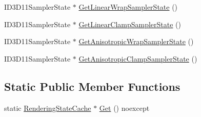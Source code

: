 \begin{DoxyCompactItemize}
\item 
I\+D3\+D11\+Sampler\+State $\ast$ \hyperlink{structmage_1_1_rendering_state_cache_abcd4b98f9c0170466551901845c86824}{Get\+Linear\+Wrap\+Sampler\+State} ()
\item 
I\+D3\+D11\+Sampler\+State $\ast$ \hyperlink{structmage_1_1_rendering_state_cache_a8fd935f6eaca18ee85eef482c4b0acf8}{Get\+Linear\+Clamp\+Sampler\+State} ()
\item 
I\+D3\+D11\+Sampler\+State $\ast$ \hyperlink{structmage_1_1_rendering_state_cache_a183a1b919105bd1758cc6fb6cdeab018}{Get\+Anisotropic\+Wrap\+Sampler\+State} ()
\item 
I\+D3\+D11\+Sampler\+State $\ast$ \hyperlink{structmage_1_1_rendering_state_cache_ad4b0894beba4725e53a5a7ca3b9085cb}{Get\+Anisotropic\+Clamp\+Sampler\+State} ()
\end{DoxyCompactItemize}
\subsection*{Static Public Member Functions}
\begin{DoxyCompactItemize}
\item 
static \hyperlink{structmage_1_1_rendering_state_cache}{Rendering\+State\+Cache} $\ast$ \hyperlink{structmage_1_1_rendering_state_cache_a1792e037c8847d1d35219305bce42c52}{Get} () noexcept
\end{DoxyCompactItemize}
